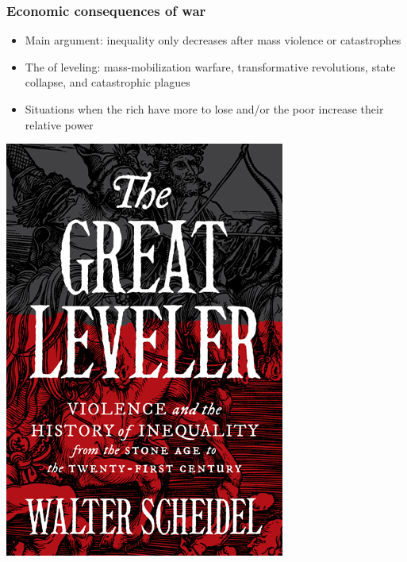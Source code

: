 \documentclass[aspectratio=43]{beamer}
\begin{document}



\begin{frame}
\frametitle{Economic consequences of war}
\centering

\begin{minipage}{0.59\textwidth}\centering
\begin{itemize}
  \item<2-> Main argument: inequality only decreases after mass violence or catastrophes
  \item<3-> The  of leveling: mass-mobilization warfare, transformative revolutions, state collapse, and catastrophic plagues
  \item<4-> Situations when the rich have more to lose and/or the poor increase their relative power
\end{itemize}
\end{minipage}\hfill
\begin{minipage}{0.39\textwidth}\centering
\includegraphics[width = \textwidth]{img/scheidel}\\\vspace{10pt}

\end{minipage}
\end{frame}
\end{document}
